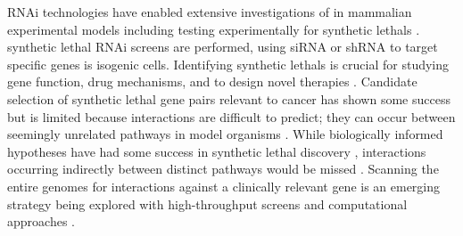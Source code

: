 \acrfull{RNAi} technologies have enabled extensive investigations of  in mammalian experimental models including testing experimentally for \glspl{synthetic lethal} \citep{Fraser2004}. \Gls{synthetic lethal} \gls{RNAi} screens are performed, using \acrfull{siRNA} or \gls{shRNA} to target specific genes is isogenic cells. Identifying \glspl{synthetic lethal} is crucial for studying gene function, drug mechanisms, and to design novel therapies \citep{Lum2004}. Candidate selection of \gls{synthetic lethal} gene pairs relevant to cancer has shown some success but is limited because interactions are difficult to predict; they can occur between seemingly unrelated \glspl{pathway} in model organisms \citep{Costanzo2011}. While biologically informed hypotheses have had some success in \gls{synthetic lethal} discovery \citep{Bitler2015, Bryant2005, Farmer2005}, interactions occurring indirectly between distinct \glspl{pathway} would be missed \citep{Boone2007, Costanzo2011}. Scanning the entire \glspl{genome} for interactions against a clinically relevant gene is an emerging strategy being explored with \glspl{high-throughput screen} \citep{Fece2015} and computational approaches \citep{Boucher2013, vanSteen2011}.    


